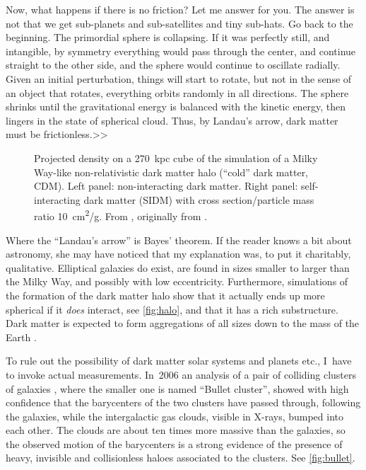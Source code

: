 Now, what happens if there is no friction? Let me answer for you. The answer is
not that we get sub-planets and sub-satellites and tiny sub-hats. Go back to
the beginning. The primordial sphere is collapsing. If it was perfectly still,
and intangible, by symmetry everything would pass through the center, and
continue straight to the other side, and the sphere would continue to oscillate
radially. Given an initial perturbation, things will start to rotate, but not
in the sense of an object that rotates, everything orbits randomly in all
directions. The sphere shrinks until the gravitational energy is balanced with
the kinetic energy, then lingers in the state of spherical cloud. Thus, by
Landau's arrow, dark matter must be frictionless.>>

\begin{figure}
    
    
    \caption{\label{fig:halo} Projected density on a \SI{270}{kpc} cube of the
    simulation of a Milky Way-like non-relativistic dark matter halo (``cold''
    dark matter, CDM). Left panel: non-interacting dark matter. Right panel:
    self-interacting dark matter (SIDM) with cross section/particle mass ratio
    \SI{10}{cm^2/g}. From \cite[21]{tulin2018}, originally from
    \cite[6]{vogelsberger2012}.}
    
\end{figure}

Where the ``Landau's arrow'' is Bayes' theorem. If the reader knows a bit about
astronomy, she may have noticed that my explanation was, to put it charitably,
qualitative. Elliptical galaxies do exist, are found in sizes smaller to larger
than the Milky Way, and possibly with low eccentricity. Furthermore,
simulations of the formation of the dark matter halo show that it actually ends
up more spherical if it \emph{does} interact, see \autoref{fig:halo}, and that
it has a rich substructure. Dark matter is expected to form aggregations of all
sizes down to the mass of the Earth \cite[1]{vogelsberger2012}.

To rule out the possibility of dark matter solar systems and planets etc.,
I~have to invoke actual measurements. In~2006 an analysis of a pair of
colliding clusters of galaxies \cite{clowe2006}, where the smaller one is named
``Bullet cluster'', showed with high confidence that the barycenters of the two
clusters have passed through, following the galaxies, while the intergalactic
gas clouds, visible in X-rays, bumped into each other. The clouds are about ten
times more massive than the galaxies, so the observed motion of the barycenters
is a strong evidence of the presence of heavy, invisible and collisionless
haloes associated to the clusters. See \autoref{fig:bullet}.

